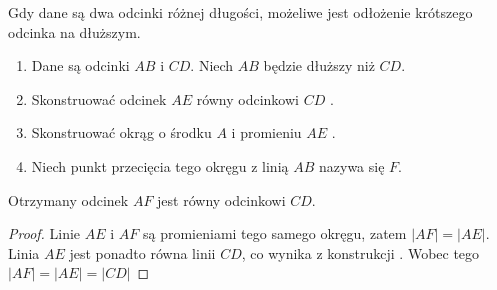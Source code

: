 \documentclass[12pt, a4paper]{scrartcl}
\begin{document}
\begin{theorem}

Gdy dane są dwa odcinki różnej długości, możeliwe jest odłożenie krótszego
odcinka na dłuższym.

\begin{figure}[h!]
    \begin{center}
    \end{center}
\end{figure}

\begin{enumerate}
    \item Dane są odcinki \(AB\) i \(CD\). Niech \(AB\) będzie dłuższy niż
        \(CD\).
    \item Skonstruować odcinek \(AE\) równy odcinkowi \(CD\) .
    \item Skonstruować okrąg o środku \(A\) i promieniu \(AE\) .
    \item Niech punkt przecięcia tego okręgu z linią \(AB\) nazywa się \(F\).
\end{enumerate}

Otrzymany odcinek \(AF\) jest równy odcinkowi \(CD\).

\begin{proof}
    Linie \(AE\) i \(AF\) są promieniami tego samego okręgu, zatem \(|AF| =
    |AE|\). Linia \(AE\) jest ponadto równa linii \(CD\), co wynika z
    konstrukcji . Wobec tego \(|AF| = |AE| = |CD|\) 
\end{proof}
\end{theorem}
\end{document}
